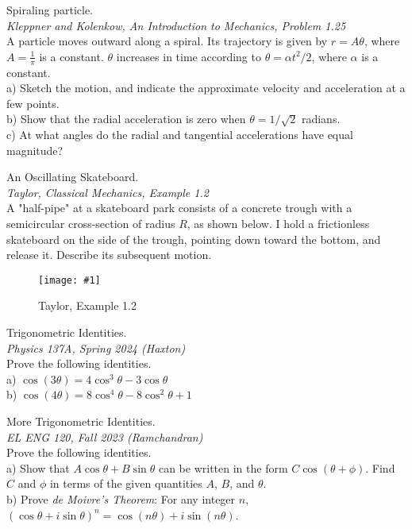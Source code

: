 \documentclass[11pt]{article}
\newcommand{\fig}[4]{
    \begin{figure}[H]
        \centering
        \texttt{[image: \#1]}
        \caption{#2}
        \label{exp4fit}
    \end{figure}
}
\theoremstyle{gangnamstyle}{\newtheorem{definition}{Definition}[]}
\theoremstyle{gangnamstyle}{\newtheorem{example}{Example}[]}
\theoremstyle{gangnamstyle}{\newtheorem{problem}{Problem}[]}
\begin{document}
\begin{problem}
Spiraling particle. \\
\textit{Kleppner and Kolenkow, An Introduction to Mechanics, Problem 1.25} \\
A particle moves outward along a spiral. Its trajectory is given by $r = A\theta$, where $A = \frac{1}{\pi}$ is a constant. $\theta$ increases in time according to $\theta = \alpha t^2 / 2$, where $\alpha$ is a constant. \\ 

a) Sketch the motion, and indicate the approximate velocity and acceleration at a few points. \\
b) Show that the radial acceleration is zero when $\theta = 1 / \sqrt{2}$ radians.  \\
c) At what angles do the radial and tangential accelerations have equal magnitude? \\
\end{problem}

\begin{problem}
An Oscillating Skateboard. \\
\textit{Taylor, Classical Mechanics, Example 1.2} \\
A "half-pipe" at a skateboard park consists of a concrete trough with a semicircular cross-section of radius $R$, as shown below. I hold a frictionless skateboard on the side of the trough, pointing down toward the bottom, and release it. Describe its subsequent motion. 
\fig{figs/n0/taylor.jpg}{Taylor, Example 1.2}{0.4}{0}
\end{problem}

\begin{problem}
Trigonometric Identities. \\
\textit{Physics 137A, Spring 2024 (Haxton)} \\
Prove the following identities. \\ 

a) $\cos(3\theta) = 4\cos^3\theta - 3\cos\theta$ \\
b) $\cos(4\theta) = 8\cos^4\theta - 8\cos^2\theta + 1$ 
\end{problem}

\begin{problem}
More Trigonometric Identities. \\
\textit{EL ENG 120, Fall 2023 (Ramchandran)} \\
Prove the following identities. \\ 

a) Show that $A\cos\theta + B\sin\theta$ can be written in the form $C\cos(\theta + \phi)$. Find $C$ and $\phi$ in terms of the given quantities $A$, $B$, and $\theta$. \\
b) Prove \textit{de Moivre's Theorem}: For any integer $n$, $(\cos\theta + i\sin\theta)^n = \cos(n\theta) + i\sin(n\theta)$.  
\end{problem}
\end{document}
